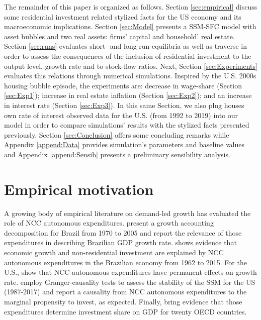 \documentclass[12pt, a4]{article}
\begin{document}
The remainder of this paper is organized as follows.
Section \ref{sec:empirical} discuss some residential investment related stylized facts for the US economy and its macroeconomic implications.
Section \ref{sec:Model} presents a SSM-SFC model  with asset bubbles and two real assets: firms' capital and household' real estate. 
Section \ref{sec:runs} evaluates short- and long-run equilibria as well as traverse in order to assess the consequences  of the inclusion of residential investment to the output level, growth rate and to stock-flow ratios.
Next, Section \ref{sec:Experiments} evaluates this relations through numerical simulations.
Inspired by the U.S. 2000s housing bubble episode, the experiments are: decrease in wage-share (Section \ref{sec:Exp1}); increase in real estate inflation (Section \ref{sec:Exp2}); and an increase in interest rate (Section \ref{sec:Exp3}).
In this same Section, we also plug houses own rate of interest observed data for the U.S. (from 1992 to 2019) into our model in order to compare simulations' results with the stylized facts presented previously.
Section \ref{sec:Conclusion} offers some concluding remarks while Appendix \ref{append:Data} provides simulation's parameters and baseline values and Appendix \ref{append:Sensib} presents a preliminary sensibility analysis.


\section{Empirical motivation}
\label{sec:org114faad}
\label{sec:empirical}
A growing body of empirical literature on demand-led growth has evaluated the role of NCC autonomous expenditures.
\textcite{freitas_pattern_2013} present a growth accounting decomposition for Brazil from 1970 to 2005 and report the relevance of those expenditures in describing Brazilian GDP growth rate.
\textcite{braga_investment_2020} shows evidence that economic growth and non-residential investment are explained by NCC autonomous expenditures in the Brazilian economy from 1962 to 2015.
For the U.S., \textcite{girardi_long-run_2016} show that NCC autonomous expenditures have permanent effects on growth rate.
\textcite{haluska_growth_2020} employ Granger-causality tests to assess the stability of the SSM for the US (1987-2017) and report a causality from NCC autonomous expenditures to the marginal propensity to invest, as expected.
Finally, \textcite{girardi_autonomous_2020} bring evidence that those expenditures determine investment share on GDP for twenty OECD countries.
\end{document}
